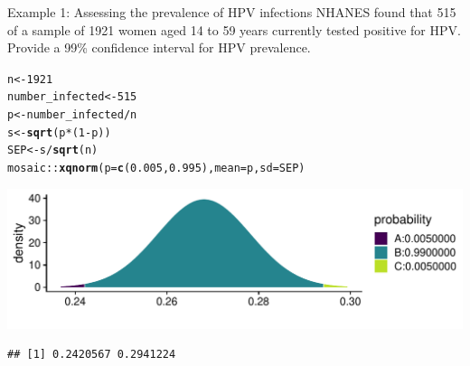 \documentclass[10pt]{beamer}\usepackage[]{graphicx}\usepackage[]{color}
\makeatletter
\def\maxwidth{ %
  \ifdim\Gin@nat@width>\linewidth
    \linewidth
  \else
    \Gin@nat@width
  \fi
}
\newcommand{\hlnum}[1]{\textcolor[rgb]{0.686,0.059,0.569}{#1}}%
\newcommand{\hlopt}[1]{\textcolor[rgb]{0,0,0}{#1}}%
\newcommand{\hlstd}[1]{\textcolor[rgb]{0.345,0.345,0.345}{#1}}%
\newcommand{\hlkwb}[1]{\textcolor[rgb]{0.69,0.353,0.396}{#1}}%
\newcommand{\hlkwc}[1]{\textcolor[rgb]{0.333,0.667,0.333}{#1}}%
\newcommand{\hlkwd}[1]{\textcolor[rgb]{0.737,0.353,0.396}{\textbf{#1}}}%
\newenvironment{kframe}{%
 \def\at@end@of@kframe{}%
 \ifinner\ifhmode%
  \def\at@end@of@kframe{\end{minipage}}%
  \begin{minipage}{\columnwidth}%
 \fi\fi%
 \def\FrameCommand##1{\hskip\@totalleftmargin \hskip-\fboxsep
 \colorbox{shadecolor}{##1}\hskip-\fboxsep
     \hskip-\linewidth \hskip-\@totalleftmargin \hskip\columnwidth}%
 \MakeFramed {\advance\hsize-\width
   \@totalleftmargin\z@ \linewidth\hsize
   \@setminipage}}%
 {\par\unskip\endMakeFramed%
 \at@end@of@kframe}
\newenvironment{knitrout}{}{} %
\makeatother
\begin{document}
\begin{frame}[fragile]{Example 1: Assessing the prevalence of HPV infections}
	\small
	NHANES found that 515 of a sample of 1921 women aged 14 to 59 years currently tested positive for HPV. Provide a 99\% confidence interval for HPV prevalence. 
	
\begin{knitrout}\tiny
{}\color{fgcolor}\begin{kframe}
\begin{alltt}
\hlstd{n} \hlkwb{<-} \hlnum{1921}
\hlstd{number_infected} \hlkwb{<-} \hlnum{515}
\hlstd{p} \hlkwb{<-} \hlstd{number_infected} \hlopt{/} \hlstd{n}
\hlstd{s} \hlkwb{<-} \hlkwd{sqrt}\hlstd{(p} \hlopt{*} \hlstd{(}\hlnum{1} \hlopt{-} \hlstd{p))}
\hlstd{SEP} \hlkwb{<-} \hlstd{s} \hlopt{/} \hlkwd{sqrt}\hlstd{(n)}
\hlstd{mosaic}\hlopt{::}\hlkwd{xqnorm}\hlstd{(}\hlkwc{p}\hlstd{=}\hlkwd{c}\hlstd{(}\hlnum{0.005}\hlstd{,}\hlnum{0.995}\hlstd{),} \hlkwc{mean} \hlstd{= p,} \hlkwc{sd} \hlstd{= SEP)}
\end{alltt}
\end{kframe}

{\centering \includegraphics[width=\maxwidth]{figure/unnamed-chunk-14-1} 

}


\begin{kframe}\begin{verbatim}
## [1] 0.2420567 0.2941224
\end{verbatim}
\end{kframe}
\end{knitrout}
	
\end{frame}
\end{document}
